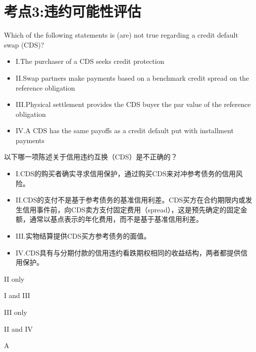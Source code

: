 \documentclass{article}
\newcounter{question} %
\begin{document}
\section{考点3:违约可能性评估}
\setcounter{question}{0}
\begin{question}
    Which of the following statements is (are) not true regarding a credit default swap (CDS)?
    \begin{itemize}
        \item I.The purchaser of a CDS seeks credit protection
        \item II.Swap partners make payments based on a benchmark credit spread on the reference obligation
        \item III.Physical settlement provides the CDS buyer the par value of the reference obligation
        \item IV.A CDS has the same payoffs as a credit default put with installment payments
    \end{itemize}
    以下哪一项陈述关于信用违约互换（CDS）是不正确的？
    \begin{itemize}
        \item I.CDS的购买者确实寻求信用保护，通过购买CDS来对冲参考债务的信用风险。
        \item II.CDS的支付不是基于参考债务的基准信用利差。CDS买方在合约期限内或发生信用事件前，向CDS卖方支付固定费用（spread），这是预先确定的固定金额，通常以基点表示的年化费用，而不是基于基准信用利差。
        \item III.实物结算提供CDS买方参考债务的面值。
        \item IV.CDS具有与分期付款的信用违约看跌期权相同的收益结构，两者都提供信用保护。
    \end{itemize}
\end{question}

\begin{choices}
    \item II only
    \item I and III
    \item III only
    \item II and IV
\end{choices}

\begin{correctanswer}
    A
\end{correctanswer}
\end{document}
